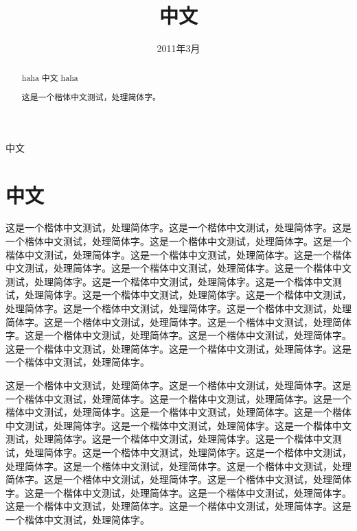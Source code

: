 \documentclass[]{article}
\date{2011年3月}
\title{中文}
\author{}
\begin{document}
\begin{CJK}{UTF8}{gkai}
\maketitle

\begin{abstract}
haha 中文 haha

	这是一个楷体中文测试，处理简体字。

\end{abstract}
中文
\section{中文}

	这是一个楷体中文测试，处理简体字。这是一个楷体中文测试，处理简体字。这是一个楷体中文测试，处理简体字。这是一个楷体中文测试，处理简体字。这是一个楷体中文测试，处理简体字。这是一个楷体中文测试，处理简体字。这是一个楷体中文测试，处理简体字。这是一个楷体中文测试，处理简体字。这是一个楷体中文测试，处理简体字。这是一个楷体中文测试，处理简体字。这是一个楷体中文测试，处理简体字。这是一个楷体中文测试，处理简体字。这是一个楷体中文测试，处理简体字。这是一个楷体中文测试，处理简体字。这是一个楷体中文测试，处理简体字。这是一个楷体中文测试，处理简体字。这是一个楷体中文测试，处理简体字。这是一个楷体中文测试，处理简体字。这是一个楷体中文测试，处理简体字。这是一个楷体中文测试，处理简体字。这是一个楷体中文测试，处理简体字。这是一个楷体中文测试，处理简体字。

	这是一个楷体中文测试，处理简体字。这是一个楷体中文测试，处理简体字。这是一个楷体中文测试，处理简体字。这是一个楷体中文测试，处理简体字。这是一个楷体中文测试，处理简体字。这是一个楷体中文测试，处理简体字。这是一个楷体中文测试，处理简体字。这是一个楷体中文测试，处理简体字。这是一个楷体中文测试，处理简体字。这是一个楷体中文测试，处理简体字。这是一个楷体中文测试，处理简体字。这是一个楷体中文测试，处理简体字。这是一个楷体中文测试，处理简体字。这是一个楷体中文测试，处理简体字。这是一个楷体中文测试，处理简体字。这是一个楷体中文测试，处理简体字。这是一个楷体中文测试，处理简体字。这是一个楷体中文测试，处理简体字。这是一个楷体中文测试，处理简体字。这是一个楷体中文测试，处理简体字。这是一个楷体中文测试，处理简体字。这是一个楷体中文测试，处理简体字。


\end{CJK}
\end{document}
